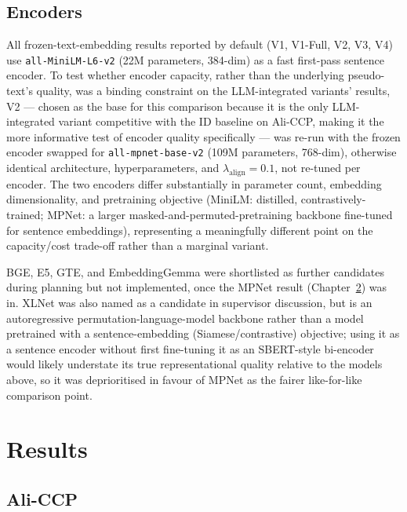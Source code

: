 \documentclass{uclthesis}
\begin{document}
\section{Encoders}
\label{sec:encoders}

All frozen-text-embedding results reported by default (V1, V1-Full, V2, V3, V4) use \texttt{all-MiniLM-L6-v2} \citep{reimers2019sbert} (22M parameters, 384-dim) as a fast first-pass sentence encoder. To test whether encoder capacity, rather than the underlying pseudo-text's quality, was a binding constraint on the LLM-integrated variants' results, V2 --- chosen as the base for this comparison because it is the only LLM-integrated variant competitive with the ID baseline on Ali-CCP, making it the more informative test of encoder quality specifically --- was re-run with the frozen encoder swapped for \texttt{all-mpnet-base-v2} \citep{song2020mpnet} (109M parameters, 768-dim), otherwise identical architecture, hyperparameters, and $\lambda_{\text{align}}=0.1$, not re-tuned per encoder. The two encoders differ substantially in parameter count, embedding dimensionality, and pretraining objective (MiniLM: distilled, contrastively-trained; MPNet: a larger masked-and-permuted-pretraining backbone fine-tuned for sentence embeddings), representing a meaningfully different point on the capacity/cost trade-off rather than a marginal variant.

BGE, E5, GTE, and EmbeddingGemma were shortlisted as further candidates during planning but not implemented, once the MPNet result (Chapter~\ref{chap:results}) was in. XLNet \citep{yang2019xlnet} was also named as a candidate in supervisor discussion, but is an autoregressive permutation-language-model backbone rather than a model pretrained with a sentence-embedding (Siamese/contrastive) objective; using it as a sentence encoder without first fine-tuning it as an SBERT-style bi-encoder would likely understate its true representational quality relative to the models above, so it was deprioritised in favour of MPNet as the fairer like-for-like comparison point.

\chapter{Results}
\label{chap:results}

\section{Ali-CCP}
\label{sec:results-aliccp}
\end{document}

